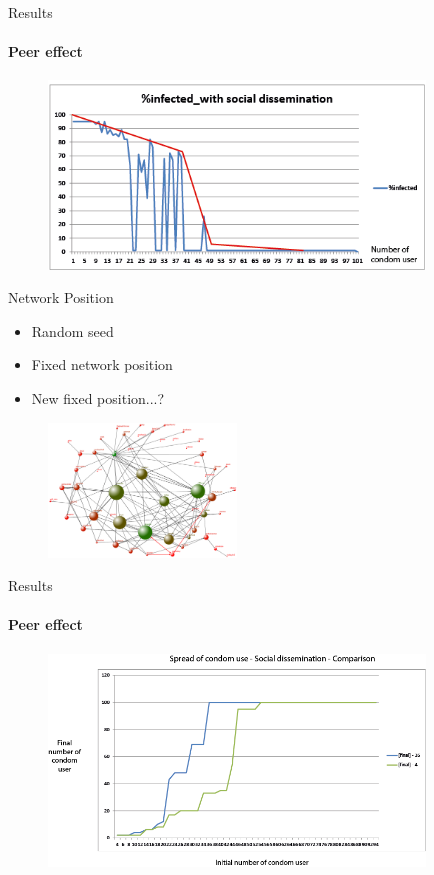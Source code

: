 \documentclass{beamer}
\begin{document}
\begin{frame}{Results}
\framesubtitle{\bf{Peer effect}}
	\begin{figure}[H]
		\centering
		\includegraphics[width=10.0cm]{./img/infected_withsocialdissemination.png}
	\end{figure} 
\end{frame}

\begin{frame}{Network Position}
	\begin{itemize}
		\item Random seed
		\item Fixed network position
		\item New fixed position...?
	\end{itemize}

	\begin{figure}[H]
		\centering
		\includegraphics[width=5.0cm]{./img/positioneau.png}
	\end{figure}
\end{frame}

\begin{frame}{Results}
\framesubtitle{\bf{Peer effect}}
	\begin{figure}[H]
		\centering
		\includegraphics[width=10.0cm]{./img/Spreadcondom_comparison.png}
	\end{figure} 
\end{frame}
\end{document}
